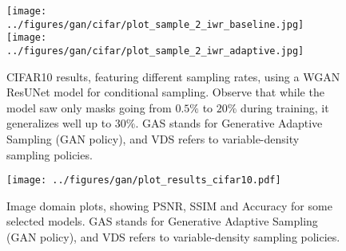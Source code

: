 \begin{figure}[!ht]
    \centering
    \texttt{[image: ../figures/gan/cifar/plot\_sample\_2\_iwr\_baseline.jpg]}
    \texttt{[image: ../figures/gan/cifar/plot\_sample\_2\_iwr\_adaptive.jpg]}
\caption{CIFAR10 results, featuring different sampling rates, using a WGAN ResUNet model for conditional sampling. Observe that while the model saw only masks going from $0.5\%$ to $20\%$ during training, it generalizes well up to $30\%$.  GAS stands for Generative Adaptive Sampling (GAN policy), and VDS refers to variable-density sampling policies.}\label{fig:image_cifar10_2}
\end{figure}

\begin{figure}[!ht]
    \centering
    \texttt{[image: ../figures/gan/plot\_results\_cifar10.pdf]}
\caption{Image domain plots, showing PSNR, SSIM and Accuracy for some selected models. GAS stands for Generative Adaptive Sampling (GAN policy), and VDS refers to variable-density sampling policies.}\label{fig:plt_cifar10}
\end{figure}

\begin{table}[!ht]
\centering
{}
\caption{Average test set AUC (one AUC per image) with standard deviation on CIFAR10, in image domain. This was computed on a subset of the test set.}\label{tab:comp_cifar}    
\end{table}

%
